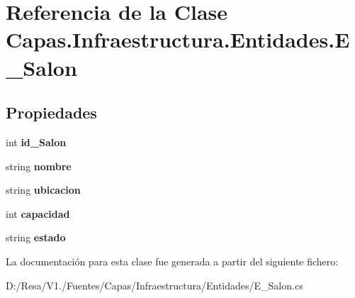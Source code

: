\section{Referencia de la Clase Capas.\+Infraestructura.\+Entidades.\+E\+\_\+\+Salon}
\label{class_capas_1_1_infraestructura_1_1_entidades_1_1_e___salon}
\subsection*{Propiedades}
\begin{DoxyCompactItemize}
\item 
int {\bfseries id\+\_\+\+Salon}\hspace{0.3cm}{\ttfamily  [get, set]}\label{class_capas_1_1_infraestructura_1_1_entidades_1_1_e___salon_aac9fca1e4d9ea633f1bf895842840c31}

\item 
string {\bfseries nombre}\hspace{0.3cm}{\ttfamily  [get, set]}\label{class_capas_1_1_infraestructura_1_1_entidades_1_1_e___salon_a6e597bccad164668591ff33dbb4782f9}

\item 
string {\bfseries ubicacion}\hspace{0.3cm}{\ttfamily  [get, set]}\label{class_capas_1_1_infraestructura_1_1_entidades_1_1_e___salon_afd3cb1b8249d4f45a85d7f86b61e7386}

\item 
int {\bfseries capacidad}\hspace{0.3cm}{\ttfamily  [get, set]}\label{class_capas_1_1_infraestructura_1_1_entidades_1_1_e___salon_af19f4688f9ea354b074a46ddd84812df}

\item 
string {\bfseries estado}\hspace{0.3cm}{\ttfamily  [get, set]}\label{class_capas_1_1_infraestructura_1_1_entidades_1_1_e___salon_af21b858b968488f09677491151dcaf4d}

\end{DoxyCompactItemize}


La documentación para esta clase fue generada a partir del siguiente fichero\+:\begin{DoxyCompactItemize}
\item 
D\+:/\+Resa/\+V1./\+Fuentes/\+Capas/\+Infraestructura/\+Entidades/E\+\_\+\+Salon.\+cs\end{DoxyCompactItemize}
